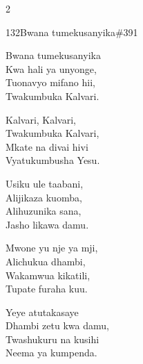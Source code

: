 \documentclass{article}
\begin{document}
\begin{multicols}{2}
\begin{hymn}{132}{Bwana tumekusanyika}{\#391}
\begin{stanza}
Bwana tumekusanyika\\
Kwa hali ya unyonge,\\
Tuonavyo mifano hii,\\
Twakumbuka Kalvari.
\end{stanza}
\begin{chorus}
Kalvari, Kalvari,\\
Twakumbuka Kalvari,\\
Mkate na divai hivi\\
Vyatukumbusha Yesu.
\end{chorus}
\begin{stanza}
Usiku ule taabani,\\
Alijikaza kuomba,\\
Alihuzunika sana,\\
Jasho likawa damu.
\end{stanza}
\begin{stanza}
Mwone yu nje ya mji,\\
Alichukua dhambi,\\
Wakamwua kikatili,\\
Tupate furaha kuu.
\end{stanza}
\begin{stanza}
Yeye atutakasaye\\
Dhambi zetu kwa damu,\\
Twashukuru na kusihi\\
Neema ya kumpenda.
\end{stanza}
\end{hymn}


\end{multicols}
\end{document}
